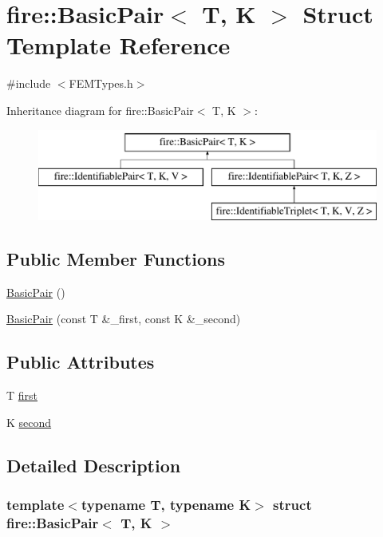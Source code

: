 \hypertarget{a00768}{}\section{fire\+:\+:Basic\+Pair$<$ T, K $>$ Struct Template Reference}
\label{a00768}


{\ttfamily \#include $<$F\+E\+M\+Types.\+h$>$}

Inheritance diagram for fire\+:\+:Basic\+Pair$<$ T, K $>$\+:\begin{figure}[H]
\begin{center}
\leavevmode
\includegraphics[height=3.000000cm]{a00768}
\end{center}
\end{figure}
\subsection*{Public Member Functions}
\begin{DoxyCompactItemize}
\item 
\hyperlink{a00768_a28eae46234d49126ac4727e7883174a4}{Basic\+Pair} ()
\item 
\hyperlink{a00768_ada8fa3f47bae245613d050598ac8488c}{Basic\+Pair} (const T \&\+\_\+first, const K \&\+\_\+second)
\end{DoxyCompactItemize}
\subsection*{Public Attributes}
\begin{DoxyCompactItemize}
\item 
T \hyperlink{a00768_a4e073a19bf2d3330d105d81a8febc4be}{first}
\item 
K \hyperlink{a00768_aecd2977e2fb903a5b106e4b5d7ab3bac}{second}
\end{DoxyCompactItemize}


\subsection{Detailed Description}
\subsubsection*{template$<$typename T, typename K$>$\newline
struct fire\+::\+Basic\+Pair$<$ T, K $>$}

